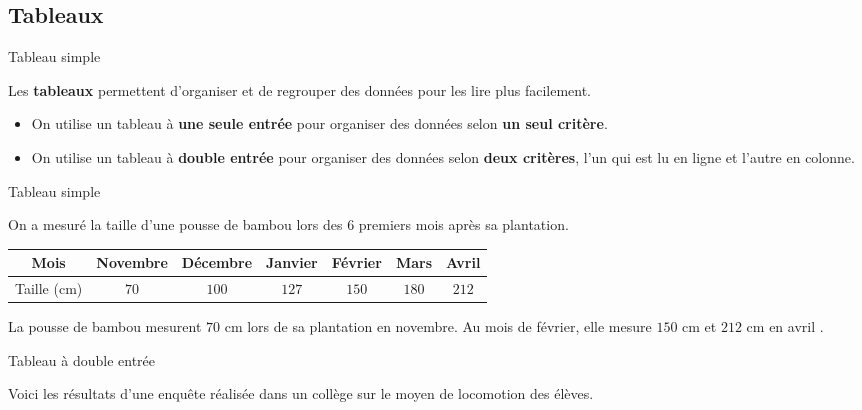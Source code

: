\begin{pageCours} 

\section{Tableaux}

\begin{DefT}{Tableau simple}

Les \textbf{tableaux} permettent d'organiser et de regrouper des données pour les lire plus facilement.
\begin{itemize}[leftmargin=*]
\item On utilise un tableau à \textbf{une seule entrée} pour organiser des données selon \textbf{un seul critère}.
\item On utilise un tableau à \textbf{double entrée} pour organiser des données selon \textbf{deux critères}, l'un qui est lu en ligne et l'autre en colonne.
\end{itemize}

\end{DefT}


\begin{ExT}{Tableau simple}

On a mesuré la taille d'une pousse de bambou lors des 6 premiers mois après sa plantation.
 \begin{center}
 \begin{tabular}{|c|c|c|c|c|c|c|} 
  \hline
  Mois & Novembre & Décembre & Janvier  & Février & Mars & Avril \\
  \hline
  Taille (cm) & \textcolor{sacado_green}{$70$} & $100$ & $127$ & \textcolor{sacado_violet}{$150$} & $180$ & \textcolor{sacado_orange}{$212$}  \\
  \hline
 \end{tabular}
 \end{center}

La pousse de bambou mesurent \textcolor{sacado_green}{$70$} cm lors de sa plantation en novembre. Au mois de février, elle mesure \textcolor{sacado_violet}{$150$} cm et \textcolor{sacado_orange}{$212$} cm en avril .
\end{ExT}


\begin{ExT}{Tableau à double entrée}

	Voici les résultats d'une enquête réalisée dans un collège sur le moyen de locomotion des élèves.


\end{ExT}
\end{pageCours}

